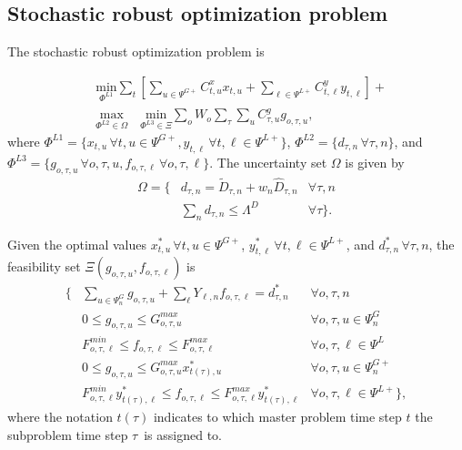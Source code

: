 \subsection{Stochastic robust optimization problem}

The stochastic robust optimization problem is

\begin{align}
&\label{saro_obj} \underset{\Phi^{L1}}{\text{min}} \sum\limits_{t} \left[ \sum\limits_{u \in \Psi^{G+}} C^x_{t, u} x_{t, u} + \sum\limits_{\ell \in \Psi^{L+}} C^y_{t, \ell} y_{t, \ell} \right] +  \\
&\underset{\Phi^{L2} \in \Omega}{\text{max}} \quad \underset{\Phi^{L3} \in \Xi}{\text{min}} \sum\limits_o W_o \sum\limits_{\tau} \sum\limits_{u} C^g_{\tau, u} g_{o, \tau, u},
\end{align}
where $\Phi^{L1} = \{ x_{t, u} \, \forall t, u \in  \Psi^{G+}, y_{t, \ell} \, \forall t, \ell \in  \Psi^{L+} \}$, $\Phi^{L2} = \{ d_{\tau, n} \, \forall \tau, n \}$, and $\Phi^{L3} = \{ g_{o, \tau, u} \, \forall o, \tau, u, f_{o, \tau, \ell} \, \forall o, \tau, \ell \}$. The uncertainty set $\Omega$ is given by
\begin{align}
\Omega = \{ &d_{\tau, n} = \tilde{D}_{\tau, n} + w_n \hat{D}_{\tau, n} & \forall \tau, n \nonumber \\
\label{uncertainty_set}&\sum\limits_n d_{\tau, n} \leq \Lambda^D & \forall \tau \}.
\end{align}

Given the optimal values $x_{t, u}^* \, \forall t, u \in \Psi^{G+}$, $y_{t, \ell}^* \, \forall t, \ell \in \Psi^{L+}$, and $d_{\tau, n}^* \, \forall \tau, n$, the feasibility set $\Xi(g_{o, \tau, u}, f_{o, \tau, \ell})$ is
\begin{align}
\{ &\sum\limits_{u \in \Psi^G_{n}} g_{o, \tau, u} + \sum\limits_{\ell} Y_{\ell, n} f_{o, \tau, \ell} = d_{\tau, n}^* & \forall o, \tau, n\\
&0 \leq g_{o, \tau, u} \leq G_{o, \tau, u}^{max} & \forall o, \tau, u \in \Psi_n^G\\
&F_{o, \tau, \ell}^{min} \leq f_{o, \tau, \ell} \leq F_{o, \tau, \ell}^{max} & \forall o, \tau, \ell \in \Psi^L \\
&0 \leq g_{o, \tau, u} \leq G_{o, \tau, u}^{max} x_{t(\tau), u}^* & \forall o, \tau, u \in \Psi_n^{G+} \\
&F_{o, \tau, \ell}^{min} y_{t(\tau), \ell}^* \leq f_{o, \tau, \ell} \leq F_{o, \tau, \ell}^{max} y_{t(\tau), \ell}^* & \forall o, \tau, \ell \in \Psi^{L+} \},
\end{align}
where the notation $t(\tau)$ indicates to which master problem time step $t$ the subproblem time step $\tau$ is assigned to.

